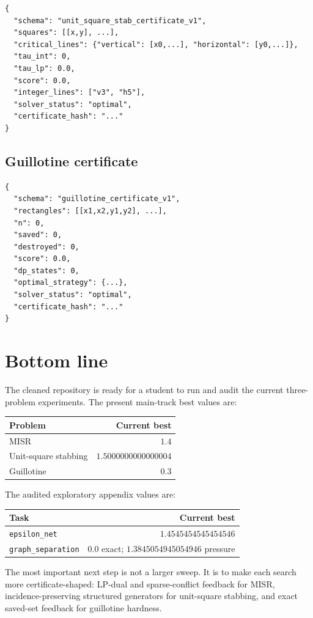 \documentclass[11pt]{article}
\newcommand{\code}[1]{\texttt{#1}}
\begin{document}
\begin{verbatim}
{
  "schema": "unit_square_stab_certificate_v1",
  "squares": [[x,y], ...],
  "critical_lines": {"vertical": [x0,...], "horizontal": [y0,...]},
  "tau_int": 0,
  "tau_lp": 0.0,
  "score": 0.0,
  "integer_lines": ["v3", "h5"],
  "solver_status": "optimal",
  "certificate_hash": "..."
}
\end{verbatim}

\subsection{Guillotine certificate}

\begin{verbatim}
{
  "schema": "guillotine_certificate_v1",
  "rectangles": [[x1,x2,y1,y2], ...],
  "n": 0,
  "saved": 0,
  "destroyed": 0,
  "score": 0.0,
  "dp_states": 0,
  "optimal_strategy": {...},
  "solver_status": "optimal",
  "certificate_hash": "..."
}
\end{verbatim}

\section{Bottom line}

The cleaned repository is ready for a student to run and audit the current
three-problem experiments.  The present main-track best values are:
\begin{center}
\begin{tabular}{lr}
\toprule
Problem & Current best \\
\midrule
MISR & $1.4$ \\
Unit-square stabbing & $1.5000000000000004$ \\
Guillotine & $0.3$ \\
\bottomrule
\end{tabular}
\end{center}

The audited exploratory appendix values are:
\begin{center}
\begin{tabular}{lr}
\toprule
Task & Current best \\
\midrule
\code{epsilon\_net} & $1.4545454545454546$ \\
\code{graph\_separation} & $0.0$ exact; $1.3845054945054946$ pressure \\
\bottomrule
\end{tabular}
\end{center}

The most important next step is not a larger sweep.  It is to make each search
more certificate-shaped: LP-dual and sparse-conflict feedback for MISR,
incidence-preserving structured generators for unit-square stabbing, and
exact saved-set feedback for guillotine hardness.
\end{document}
